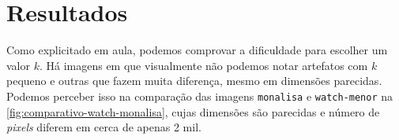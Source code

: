 \documentclass[brazilian,a4paper,twocolumn]{article}
\begin{document}
\section{Resultados}



    Como explicitado em aula, podemos comprovar a dificuldade para escolher um valor $k$. Há imagens em que visualmente não podemos notar artefatos com $k$ pequeno e outras que fazem muita diferença, mesmo em dimensões parecidas. Podemos perceber isso na comparação das imagens \texttt{monalisa} e \texttt{watch-menor} na \cref{fig:comparativo-watch-monalisa}, cujas dimensões são parecidas e número de \textit{pixels} diferem em cerca de apenas 2 mil.
\end{document}
